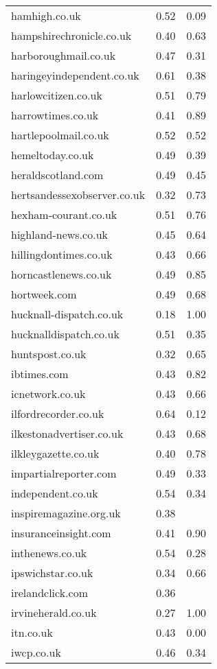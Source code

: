 \begin{longtable}{p{}p{}p{}}
  hamhigh.co.uk & 0.52 & 0.09 \\ 
  hampshirechronicle.co.uk & 0.40 & 0.63 \\ 
  harboroughmail.co.uk & 0.47 & 0.31 \\ 
  haringeyindependent.co.uk & 0.61 & 0.38 \\ 
  harlowcitizen.co.uk & 0.51 & 0.79 \\ 
  harrowtimes.co.uk & 0.41 & 0.89 \\ 
  hartlepoolmail.co.uk & 0.52 & 0.52 \\ 
  hemeltoday.co.uk & 0.49 & 0.39 \\ 
  heraldscotland.com & 0.49 & 0.45 \\ 
  hertsandessexobserver.co.uk & 0.32 & 0.73 \\ 
  hexham-courant.co.uk & 0.51 & 0.76 \\ 
  highland-news.co.uk & 0.45 & 0.64 \\ 
  hillingdontimes.co.uk & 0.43 & 0.66 \\ 
  horncastlenews.co.uk & 0.49 & 0.85 \\ 
  hortweek.com & 0.49 & 0.68 \\ 
  hucknall-dispatch.co.uk & 0.18 & 1.00 \\ 
  hucknalldispatch.co.uk & 0.51 & 0.35 \\ 
  huntspost.co.uk & 0.32 & 0.65 \\ 
  ibtimes.com & 0.43 & 0.82 \\ 
  icnetwork.co.uk & 0.43 & 0.66 \\ 
  ilfordrecorder.co.uk & 0.64 & 0.12 \\ 
  ilkestonadvertiser.co.uk & 0.43 & 0.68 \\ 
  ilkleygazette.co.uk & 0.40 & 0.78 \\ 
  impartialreporter.com & 0.49 & 0.33 \\ 
  independent.co.uk & 0.54 & 0.34 \\ 
  inspiremagazine.org.uk & 0.38 &  \\ 
  insuranceinsight.com & 0.41 & 0.90 \\ 
  inthenews.co.uk & 0.54 & 0.28 \\ 
  ipswichstar.co.uk & 0.34 & 0.66 \\ 
  irelandclick.com & 0.36 &  \\ 
  irvineherald.co.uk & 0.27 & 1.00 \\ 
  itn.co.uk & 0.43 & 0.00 \\ 
  iwcp.co.uk & 0.46 & 0.34 \\ 

\end{longtable}
